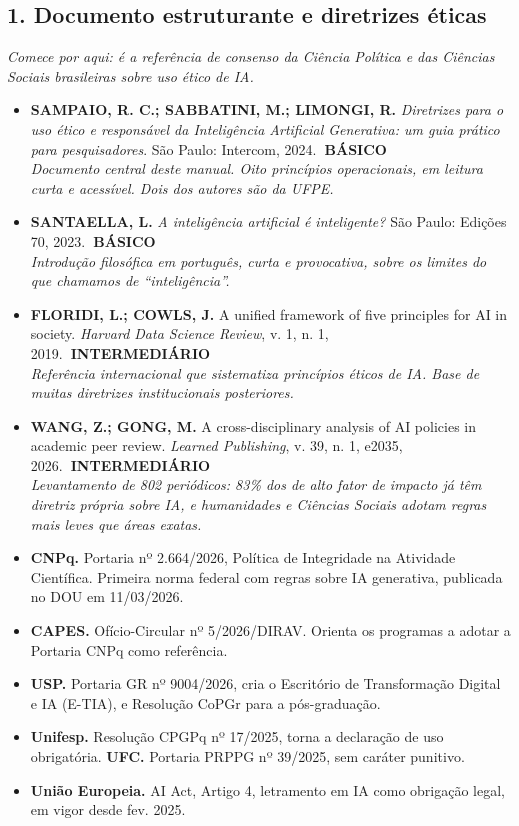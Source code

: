 \documentclass[11pt,a4paper]{article}
\newcommand{\iconBookmark}[1]{%
  \begin{tikzpicture}[baseline=-0.55ex]
    \draw[#1,line width=1pt,line join=round] (-0.11,0.15) -- (0.11,0.15) -- (0.11,-0.15) -- (0,-0.03) -- (-0.11,-0.15) -- cycle;
  \end{tikzpicture}}
\newcommand{\refc}[2]{\item #1\\{\footnotesize\color{cinzaescuro}\textit{#2}}}
\newcommand{\nivelbasico}{\hfill\colorbox{verdeCodigo}{\color{white}\scriptsize\poppinsmed\textbf{~BÁSICO~}}}
\newcommand{\nivelinterm}{\hfill\colorbox{amareloSol}{\color{black}\scriptsize\poppinsmed\textbf{~INTERMEDIÁRIO~}}}
\begin{document}
\subsection*{1. Documento estruturante e diretrizes éticas}
\textit{Comece por aqui: é a referência de consenso da Ciência Política e das Ciências Sociais brasileiras sobre uso ético de IA.}
\begin{itemize}[leftmargin=1.4em,label={}]
\refc{\textbf{SAMPAIO, R. C.; SABBATINI, M.; LIMONGI, R.} \textit{Diretrizes para o uso ético e responsável da Inteligência Artificial Generativa: um guia prático para pesquisadores}. São Paulo: Intercom, 2024.\nivelbasico}{Documento central deste manual. Oito princípios operacionais, em leitura curta e acessível. Dois dos autores são da UFPE.}
\refc{\textbf{SANTAELLA, L.} \textit{A inteligência artificial é inteligente?} São Paulo: Edições 70, 2023.\nivelbasico}{Introdução filosófica em português, curta e provocativa, sobre os limites do que chamamos de ``inteligência''.}
\refc{\textbf{FLORIDI, L.; COWLS, J.} A unified framework of five principles for AI in society. \textit{Harvard Data Science Review}, v. 1, n. 1, 2019.\nivelinterm}{Referência internacional que sistematiza princípios éticos de IA. Base de muitas diretrizes institucionais posteriores.}
\refc{\textbf{WANG, Z.; GONG, M.} A cross-disciplinary analysis of AI policies in academic peer review. \textit{Learned Publishing}, v. 39, n. 1, e2035, 2026.\nivelinterm}{Levantamento de 802 periódicos: 83\% dos de alto fator de impacto já têm diretriz própria sobre IA, e humanidades e Ciências Sociais adotam regras mais leves que áreas exatas.}
\end{itemize}

\begin{leitura}[title={\iconBookmark{white}\ \ Documentos normativos brasileiros e europeus}]
\begin{itemize}[leftmargin=1.2em,nosep,label={}]
\item \textbf{CNPq.} Portaria nº 2.664/2026, Política de Integridade na Atividade Científica. Primeira norma federal com regras sobre IA generativa, publicada no DOU em 11/03/2026.
\item \textbf{CAPES.} Ofício-Circular nº 5/2026/DIRAV. Orienta os programas a adotar a Portaria CNPq como referência.
\item \textbf{USP.} Portaria GR nº 9004/2026, cria o Escritório de Transformação Digital e IA (E-TIA), e Resolução CoPGr para a pós-graduação.
\item \textbf{Unifesp.} Resolução CPGPq nº 17/2025, torna a declaração de uso obrigatória. \textbf{UFC.} Portaria PRPPG nº 39/2025, sem caráter punitivo.
\item \textbf{União Europeia.} AI Act, Artigo 4, letramento em IA como obrigação legal, em vigor desde fev. 2025.
\end{itemize}
\end{leitura}
\end{document}
